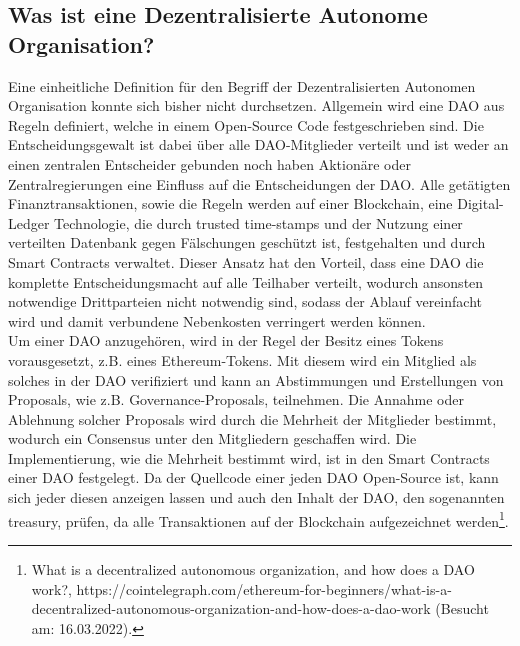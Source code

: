 \documentclass[a4paper,12pt]{report}
\begin{document}
        \subsection{Was ist eine Dezentralisierte Autonome Organisation?}
        \startsubsection
            Eine einheitliche Definition für den Begriff der Dezentralisierten Autonomen Organisation konnte sich bisher nicht durchsetzen. Allgemein wird eine DAO aus Regeln definiert, welche in einem Open-Source Code festgeschrieben sind. Die Entscheidungsgewalt ist dabei über alle DAO-Mitglieder verteilt und ist weder an einen zentralen Entscheider gebunden noch haben Aktionäre oder Zentralregierungen eine Einfluss auf die Entscheidungen der DAO. Alle getätigten Finanztransaktionen, sowie die Regeln werden auf einer Blockchain, eine Digital-Ledger Technologie, die durch trusted time-stamps und der Nutzung einer verteilten Datenbank gegen Fälschungen geschützt ist, festgehalten und durch Smart Contracts verwaltet. Dieser Ansatz hat den Vorteil, dass eine DAO die komplette Entscheidungsmacht auf alle Teilhaber verteilt, wodurch ansonsten notwendige Drittparteien nicht notwendig sind, sodass der Ablauf vereinfacht wird und damit verbundene Nebenkosten verringert werden können. \\
            Um einer DAO anzugehören, wird in der Regel der Besitz eines Tokens vorausgesetzt, z.B. eines Ethereum-Tokens. Mit diesem wird ein Mitglied als solches in der DAO verifiziert und kann an Abstimmungen und Erstellungen von Proposals, wie z.B. Governance-Proposals, teilnehmen. Die Annahme oder Ablehnung solcher Proposals wird durch die Mehrheit der Mitglieder bestimmt, wodurch ein Consensus unter den Mitgliedern geschaffen wird. Die Implementierung, wie die Mehrheit bestimmt wird, ist in den Smart Contracts einer DAO festgelegt. Da der Quellcode einer jeden DAO Open-Source ist, kann sich jeder diesen anzeigen lassen und auch den Inhalt der DAO, den sogenannten treasury, prüfen, da alle Transaktionen auf der Blockchain aufgezeichnet werden\footnote{\hspace{0.5em}\begin{minipage}[t]{13cm}What is a decentralized autonomous organization, and how does a DAO work?, https://cointelegraph.com/ethereum-for-beginners/what-is-a-decentralized-autonomous-organization-and-how-does-a-dao-work (Besucht am: 16.03.2022).\end{minipage}}.
        \closesection
\end{document}
